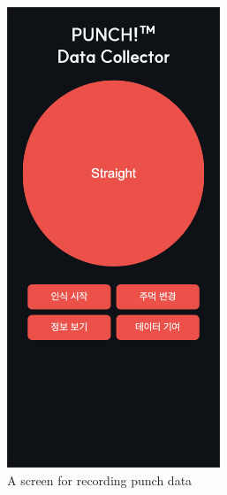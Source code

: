 \documentclass{article}
\begin{document}
\FloatBarrier
\begin{figure}[h]
    \centering
    \begin{subfigure}{0.5\textwidth}
        \centering
        \includegraphics[width=0.7\textwidth]{data_collection_web.png}
        \caption{A screen for recording punch data}
        \label{fig:data_collection_web}
    \end{subfigure}%
    \begin{subfigure}{0.5\textwidth}
        \centering

\end{subfigure}
\end{figure}
\end{document}
